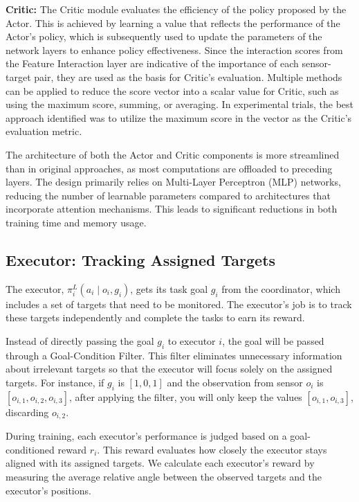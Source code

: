 \documentclass[preprint,12pt]{elsarticle}
\begin{document}

\noindent\textbf{Critic:} The Critic module evaluates the efficiency of the policy proposed by the Actor. This is achieved by learning a value that reflects the performance of the Actor's policy, which is subsequently used to update the parameters of the network layers to enhance policy effectiveness. Since the interaction scores from the Feature Interaction layer are indicative of the importance of each sensor-target pair, they are used as the basis for Critic's evaluation. Multiple methods can be applied to reduce the score vector into a scalar value for Critic, such as using the maximum score, summing, or averaging. In experimental trials, the best approach identified was to utilize the maximum score in the vector as the Critic's evaluation metric. 


The architecture of both the Actor and Critic components is more streamlined than in original approaches, as most computations are offloaded to preceding layers. The design primarily relies on Multi-Layer Perceptron (MLP) networks, reducing the number of learnable parameters compared to architectures that incorporate attention mechanisms. This leads to significant reductions in both training time and memory usage.

\subsection{Executor: Tracking Assigned Targets}
The executor, $\pi^{L}_i(a_i \mid o_i,g_i)$, gets its task goal $g_i$ from the coordinator, which includes a set of targets that need to be monitored. The executor's job is to track these targets independently and complete the tasks to earn its reward. 

Instead of directly passing the goal $g_i$ to executor $i$, the goal will be passed through a Goal-Condition Filter. This filter eliminates unnecessary information about irrelevant targets so that the executor will focus solely on the assigned targets. For instance, if $g_i$ is $[1,0,1]$ and the observation from sensor $o_i$ is $[o_{i,1}, o_{i,2}, o_{i,3}]$, after applying the filter, you will only keep the values $[o_{i,1}, o_{i,3}]$, discarding $o_{i,2}$.

During training, each executor's performance is judged based on a goal-conditioned reward $r_i$. This reward evaluates how closely the executor stays aligned with its assigned targets. We calculate each executor's reward by measuring the average relative angle between the observed targets and the executor's positions. 
\end{document}
